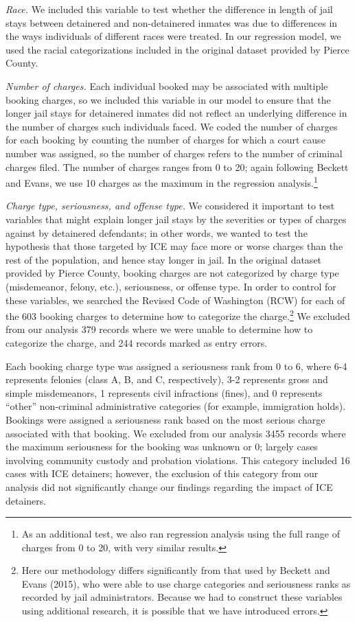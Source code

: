 \documentclass[12pt]{report}\usepackage[]{graphicx}\usepackage[]{color}
\begin{document}
\emph{Race.} We included this variable to test whether the difference in length of jail stays between detainered and non-detainered inmates was due to differences in the ways individuals of different races were treated. In our regression model, we used the racial categorizations included in the original dataset provided by Pierce County.

\emph{Number of charges.} Each individual booked may be associated with multiple booking charges, so we included this variable in our model to ensure that the longer jail stays for detainered inmates did not reflect an underlying difference in the number of charges such individuals faced. We coded the number of charges for each booking by counting the number of charges for which a court cause number was assigned, so the number of charges refers to the number of criminal charges filed. The number of charges ranges from 0 to 20; again following Beckett and Evans, we use 10 charges as the maximum in the regression analysis.\footnote{As an additional test, we also ran regression analysis using the full range of charges from 0 to 20, with very similar results.}

\emph{Charge type, seriousness, and offense type.} We considered it important to test variables that might explain longer jail stays by the severities or types of charges against by detainered defendants; in other words, we wanted to test the hypothesis that those targeted by ICE may face more or worse charges than the rest of the population, and hence stay longer in jail. In the original dataset provided by Pierce County, booking charges are not categorized by charge type (misdemeanor, felony, etc.), seriousness, or offense type. In order to control for these variables, we searched the Revised Code of Washington (RCW) for each of the 603 booking charges to determine how to categorize the charge.\footnote{Here our methodology differs significantly from that used by Beckett and Evans (2015), who were able to use charge categories and seriousness ranks as recorded by jail administrators. Because we had to construct these variables using additional research, it is possible that we have introduced errors.} We excluded from our analysis 379 records where we were unable to determine how to categorize the charge, and 244 records marked as entry errors.

Each booking charge type was assigned a seriousness rank from 0 to 6, where 6-4 represents felonies (class A, B, and C, respectively), 3-2 represents gross and simple misdemeanors, 1 represents civil infractions (fines), and 0 represents ``other'' non-criminal administrative categories (for example, immigration holds). Bookings were assigned a seriousness rank based on the most serious charge associated with that booking. We excluded from our analysis 3455 records where the maximum seriousness for the booking was unknown or 0; largely cases involving community custody and probation violations. This category included 16 cases with ICE detainers; however, the exclusion of this category from our analysis did not significantly change our findings regarding the impact of ICE detainers.
\end{document}
